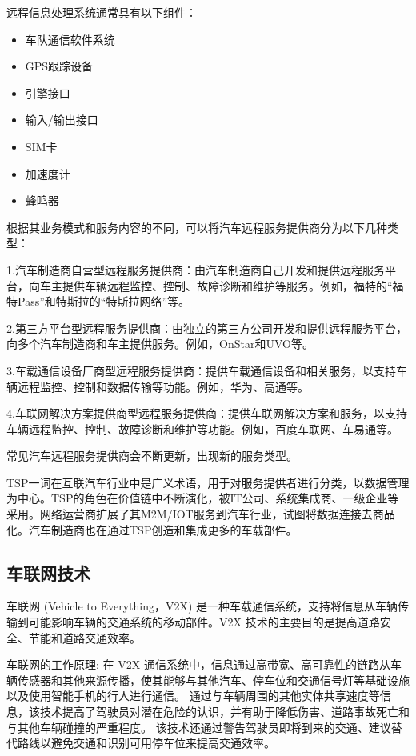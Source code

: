   远程信息处理系统通常具有以下组件：
  \begin{itemize}
    \item 车队通信软件系统
    \item GPS跟踪设备
    \item 引擎接口
    \item 输入/输出接口
    \item SIM卡
    \item 加速度计
    \item 蜂鸣器
  \end{itemize}

  根据其业务模式和服务内容的不同，可以将汽车远程服务提供商分为以下几种类型：

  1.汽车制造商自营型远程服务提供商：由汽车制造商自己开发和提供远程服务平台，向车主提供车辆远程监控、控制、故障诊断和维护等服务。例如，福特的“福特Pass”和特斯拉的“特斯拉网络”等。
  
  2.第三方平台型远程服务提供商：由独立的第三方公司开发和提供远程服务平台，向多个汽车制造商和车主提供服务。例如，OnStar和UVO等。
  
  3.车载通信设备厂商型远程服务提供商：提供车载通信设备和相关服务，以支持车辆远程监控、控制和数据传输等功能。例如，华为、高通等。
  
  4.车联网解决方案提供商型远程服务提供商：提供车联网解决方案和服务，以支持车辆远程监控、控制、故障诊断和维护等功能。例如，百度车联网、车易通等。
  
  常见汽车远程服务提供商会不断更新，出现新的服务类型。

  TSP一词在互联汽车行业中是广义术语，用于对服务提供者进行分类，以数据管理为中心。TSP的角色在价值链中不断演化，被IT公司、系统集成商、一级企业等采用。网络运营商扩展了其M2M/IOT服务到汽车行业，试图将数据连接去商品化。汽车制造商也在通过TSP创造和集成更多的车载部件。

\subsection{车联网技术}

车联网 (Vehicle to Everything，V2X) 是一种车载通信系统，支持将信息从车辆传输到可能影响车辆的交通系统的移动部件。V2X 技术的主要目的是提高道路安全、节能和道路交通效率。

车联网的工作原理: 在 V2X 通信系统中，信息通过高带宽、高可靠性的链路从车辆传感器和其他来源传播，使其能够与其他汽车、停车位和交通信号灯等基础设施以及使用智能手机的行人进行通信。
通过与车辆周围的其他实体共享速度等信息，该技术提高了驾驶员对潜在危险的认识，并有助于降低伤害、道路事故死亡和与其他车辆碰撞的严重程度。
该技术还通过警告驾驶员即将到来的交通、建议替代路线以避免交通和识别可用停车位来提高交通效率。

